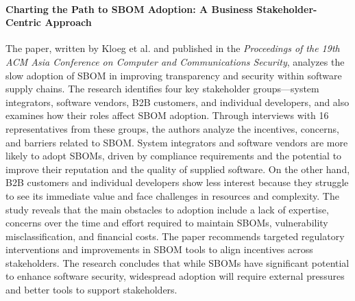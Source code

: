 \paragraph{Charting the Path to SBOM Adoption: A Business Stakeholder-Centric Approach} \cite{article:business-sbom} The paper, written by Kloeg et al. and published in the \emph{Proceedings of the 19th ACM Asia Conference on Computer and Communications Security}, analyzes the slow adoption of SBOM in improving transparency and security within software supply chains. The research identifies four key stakeholder groups—system integrators, software vendors, B2B customers, and individual developers, and also examines how their roles affect SBOM adoption. Through interviews with 16 representatives from these groups, the authors analyze the incentives, concerns, and barriers related to SBOM. System integrators and software vendors are more likely to adopt SBOMs, driven by compliance requirements and the potential to improve their reputation and the quality of supplied software. On the other hand, B2B customers and individual developers show less interest because they struggle to see its immediate value and face challenges in resources and complexity. The study reveals that the main obstacles to adoption include a lack of expertise, concerns over the time and effort required to maintain SBOMs, vulnerability misclassification, and financial costs. The paper recommends targeted regulatory interventions and improvements in SBOM tools to align incentives across stakeholders. The research concludes that while SBOMs have significant potential to enhance software security, widespread adoption will require external pressures and better tools to support stakeholders.

